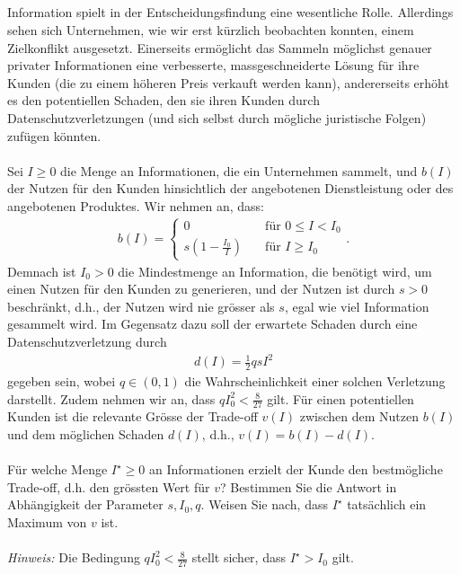 \subsection*{}
Information spielt in der Entscheidungsfindung eine wesentliche Rolle. Allerdings
sehen sich Unternehmen, wie wir erst kürzlich beobachten konnten, einem Zielkonflikt
ausgesetzt. Einerseits ermöglicht das Sammeln möglichst genauer privater Informationen eine verbesserte, massgeschneiderte Lösung für ihre Kunden (die zu einem höheren Preis verkauft werden kann), andererseits erhöht es den potentiellen Schaden, den sie ihren Kunden durch Datenschutzverletzungen (und sich selbst durch mögliche juristische Folgen) zufügen könnten.\\
\\
Sei $I \geq 0 $ die Menge an Informationen, die ein Unternehmen sammelt, und $b(I)$ der Nutzen für den Kunden hinsichtlich der angebotenen Dienstleistung oder des angebotenen Produktes. Wir nehmen an, dass:
\begin{align*}
	b(I)
	= 
	\begin{cases}
		0 &\quad \textrm{für } 0 \leq I  < I_0\\
		s \left( 1 - \frac{I_0}{I} \right) & \quad \textrm{für } I \geq I_0
	\end{cases}.
\end{align*}
Demnach ist $I_0 > 0 $ die Mindestmenge an Information, die benötigt wird, um einen Nutzen für den Kunden zu generieren, und der Nutzen ist durch $s > 0 $ beschränkt, d.h., der Nutzen wird nie grösser als $s$, egal wie viel Information gesammelt wird. Im Gegensatz dazu soll der erwartete Schaden durch eine Datenschutzverletzung durch
\begin{align*}
	d(I) = \frac{1}{2} q s I^2
\end{align*}
gegeben sein, wobei $q \in (0,1)$ die Wahrscheinlichkeit einer solchen Verletzung darstellt.
Zudem nehmen wir an, dass $q I_0^2 < \frac{8}{27}$ gilt. Für einen potentiellen Kunden ist die relevante Grösse der Trade-off $v(I)$ zwischen dem Nutzen $b(I)$ und dem möglichen Schaden $d(I)$, d.h., $v(I) = b(I) - d(I)$.\\
\\
Für welche Menge $I^\star \geq 0$ an Informationen erzielt der Kunde den bestmögliche Trade-off, d.h. den grössten Wert für $v$?
Bestimmen Sie die Antwort in Abhängigkeit der Parameter $s, I_0, q$.
Weisen Sie nach, dass $I^\star$ tatsächlich ein Maximum von $v$ ist.\\
\\
\textit{Hinweis:} Die Bedingung $q I_0^2 < \frac{8}{27}$ stellt sicher, dass $I^\star > I_0 $ gilt.

